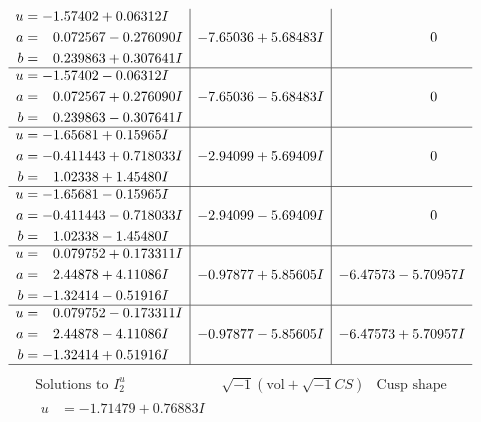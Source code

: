 \documentclass[1p]{elsarticle_modified}
\theoremstyle{definition}
\newcommand{\I}{\sqrt{-1}}
\begin{document}
$$\begin{array}{c|c|c}
\begin{aligned}
u &= -1.57402 + 0.06312 I \\
a &= \phantom{-}0.072567 - 0.276090 I \\
b &= \phantom{-}0.239863 + 0.307641 I\end{aligned}
 & -7.65036 + 5.68483 I & \phantom{-0.000000 } 0 \\ \hline\begin{aligned}
u &= -1.57402 - 0.06312 I \\
a &= \phantom{-}0.072567 + 0.276090 I \\
b &= \phantom{-}0.239863 - 0.307641 I\end{aligned}
 & -7.65036 - 5.68483 I & \phantom{-0.000000 } 0 \\ \hline\begin{aligned}
u &= -1.65681 + 0.15965 I \\
a &= -0.411443 + 0.718033 I \\
b &= \phantom{-}1.02338 + 1.45480 I\end{aligned}
 & -2.94099 + 5.69409 I & \phantom{-0.000000 } 0 \\ \hline\begin{aligned}
u &= -1.65681 - 0.15965 I \\
a &= -0.411443 - 0.718033 I \\
b &= \phantom{-}1.02338 - 1.45480 I\end{aligned}
 & -2.94099 - 5.69409 I & \phantom{-0.000000 } 0 \\ \hline\begin{aligned}
u &= \phantom{-}0.079752 + 0.173311 I \\
a &= \phantom{-}2.44878 + 4.11086 I \\
b &= -1.32414 - 0.51916 I\end{aligned}
 & -0.97877 + 5.85605 I & -6.47573 - 5.70957 I \\ \hline\begin{aligned}
u &= \phantom{-}0.079752 - 0.173311 I \\
a &= \phantom{-}2.44878 - 4.11086 I \\
b &= -1.32414 + 0.51916 I\end{aligned}
 & -0.97877 - 5.85605 I & -6.47573 + 5.70957 I\\
 \hline 
 \end{array}$$\newpage$$\begin{array}{c|c|c}  
\text{Solutions to }I^u_{2}& \I (\text{vol} + \sqrt{-1}CS) & \text{Cusp shape}\\
 \hline 
\begin{aligned}
u &= -1.71479 + 0.76883 I \\

\end{aligned}
\end{array}$$
\end{document}
